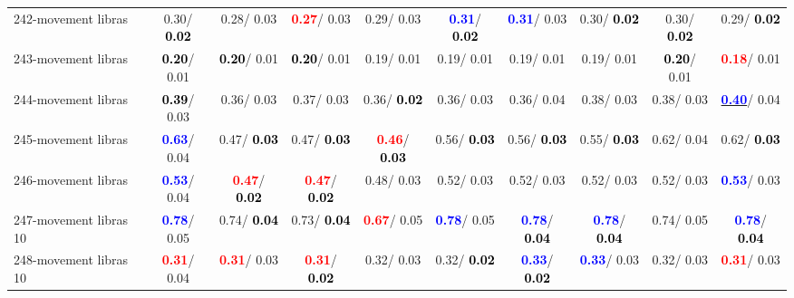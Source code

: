\begin{table}[h]
\begin{center}
{\begin{tabular}{lc|c|c|c|c|c|c|c|c}
242-movement libras &   0.30/\textcolor{black}{\textbf{  0.02}} &   0.28/  0.03 & \textcolor{red}{\textbf{  0.27}}/  0.03 &   0.29/  0.03 & \textcolor{blue}{\textbf{  0.31}}/\textcolor{black}{\textbf{  0.02}} & \textcolor{blue}{\textbf{  0.31}}/  0.03 &   0.30/\textcolor{black}{\textbf{  0.02}} &   0.30/\textcolor{black}{\textbf{  0.02}} &   0.29/\textcolor{black}{\textbf{  0.02}} \\
243-movement libras & \textcolor{black}{\textbf{  0.20}}/  0.01 & \textcolor{black}{\textbf{  0.20}}/  0.01 & \textcolor{black}{\textbf{  0.20}}/  0.01 &   0.19/  0.01 &   0.19/  0.01 &   0.19/  0.01 &   0.19/  0.01 & \textcolor{black}{\textbf{  0.20}}/  0.01 & \textcolor{red}{\textbf{  0.18}}/  0.01 \\
244-movement libras & \textcolor{black}{\textbf{  0.39}}/  0.03 &   0.36/  0.03 &   0.37/  0.03 &   0.36/\textcolor{black}{\textbf{  0.02}} &   0.36/  0.03 &   0.36/  0.04 &   0.38/  0.03 &   0.38/  0.03 & \underline{\textcolor{blue}{\textbf{  0.40}}}/  0.04 \\
245-movement libras & \textcolor{blue}{\textbf{  0.63}}/  0.04 &   0.47/\textcolor{black}{\textbf{  0.03}} &   0.47/\textcolor{black}{\textbf{  0.03}} & \textcolor{red}{\textbf{  0.46}}/\textcolor{black}{\textbf{  0.03}} &   0.56/\textcolor{black}{\textbf{  0.03}} &   0.56/\textcolor{black}{\textbf{  0.03}} &   0.55/\textcolor{black}{\textbf{  0.03}} &   0.62/  0.04 &   0.62/\textcolor{black}{\textbf{  0.03}} \\ \hline
246-movement libras & \textcolor{blue}{\textbf{  0.53}}/  0.04 & \textcolor{red}{\textbf{  0.47}}/\textcolor{black}{\textbf{  0.02}} & \textcolor{red}{\textbf{  0.47}}/\textcolor{black}{\textbf{  0.02}} &   0.48/  0.03 &   0.52/  0.03 &   0.52/  0.03 &   0.52/  0.03 &   0.52/  0.03 & \textcolor{blue}{\textbf{  0.53}}/  0.03 \\
247-movement libras 10 & \textcolor{blue}{\textbf{  0.78}}/  0.05 &   0.74/\textcolor{black}{\textbf{  0.04}} &   0.73/\textcolor{black}{\textbf{  0.04}} & \textcolor{red}{\textbf{  0.67}}/  0.05 & \textcolor{blue}{\textbf{  0.78}}/  0.05 & \textcolor{blue}{\textbf{  0.78}}/\textcolor{black}{\textbf{  0.04}} & \textcolor{blue}{\textbf{  0.78}}/\textcolor{black}{\textbf{  0.04}} &   0.74/  0.05 & \textcolor{blue}{\textbf{  0.78}}/\textcolor{black}{\textbf{  0.04}} \\
248-movement libras 10 & \textcolor{red}{\textbf{  0.31}}/  0.04 & \textcolor{red}{\textbf{  0.31}}/  0.03 & \textcolor{red}{\textbf{  0.31}}/\textcolor{black}{\textbf{  0.02}} &   0.32/  0.03 &   0.32/\textcolor{black}{\textbf{  0.02}} & \textcolor{blue}{\textbf{  0.33}}/\textcolor{black}{\textbf{  0.02}} & \textcolor{blue}{\textbf{  0.33}}/  0.03 &   0.32/  0.03 & \textcolor{red}{\textbf{  0.31}}/  0.03 \\

\end{tabular}}
\end{center}
\end{table}
